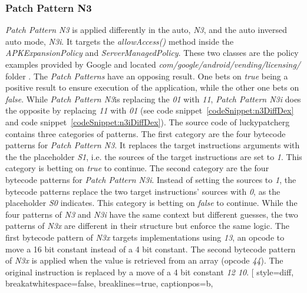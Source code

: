 \subsubsection{Patch Pattern N3}
\textit{Patch Pattern N3} is applied differently in the auto, \textit{N3}, and the auto inversed auto mode, \textit{N3i}.
It targets the \textit{allowAccess()} method inside the \textit{APKExpansionPolicy} and \textit{ServerManagedPolicy}.
These two classes are the policy examples provided by Google and located \textit{com/google/android/vending/licensing/} folder \cite{developersLicensingReference}.
\newline
The \textit{Patch Patterns} have an opposing result.
One bets on \textit{true} being a positive result to ensure execution of the application, while the other one bets on \textit{false}.
While \textit{Patch Pattern N3}is replacing the \textit{01} with \textit{11}, \textit{Patch Pattern N3i} does the opposite by replacing \textit{11} with \textit{01} (see code snippet~\ref{codeSnippet:n3DiffDex} and code snippet~\ref{codeSnippet:n3iDiffDex}).
\newline
The source code of \gls{luckypatcherg} contains three categories of patterns.
The first category are the four bytecode patterns for \textit{Patch Pattern N3}.
It replaces the target instructions arguments with the the placeholder \textit{S1}, i.e. the sources of the target instructions are set to \textit{1}.
This category is betting on \textit{true} to continue.
\newline
The second category are the four bytecode patterns for \textit{Patch Pattern N3i}.
Instead of setting the sources to \textit{1}, the bytecode patterns replace the two target instructions' sources with \textit{0}, as the placeholder \textit{S0} indicates.
This category is betting on \textit{false} to continue.
\newline
While the four patterns of \textit{N3} and \textit{N3i} have the same context but different guesses, the two patterns of \textit{N3x} are different in their structure but enforce the same logic.
The first bytecode pattern of \textit{N3x} targets implementations using \textit{13}, an opcode to move a 16 bit constant instead of a 4 bit constant.
The second bytecode pattern of \textit{N3x} is applied when the value is retrieved from an array (opcode \textit{44}).
The original instruction is replaced by a move of a 4 bit constant \textit{12 10}.
\newline
[
 style=diff,
 breakatwhitespace=false,
 breaklines=true,
 captionpos=b,

